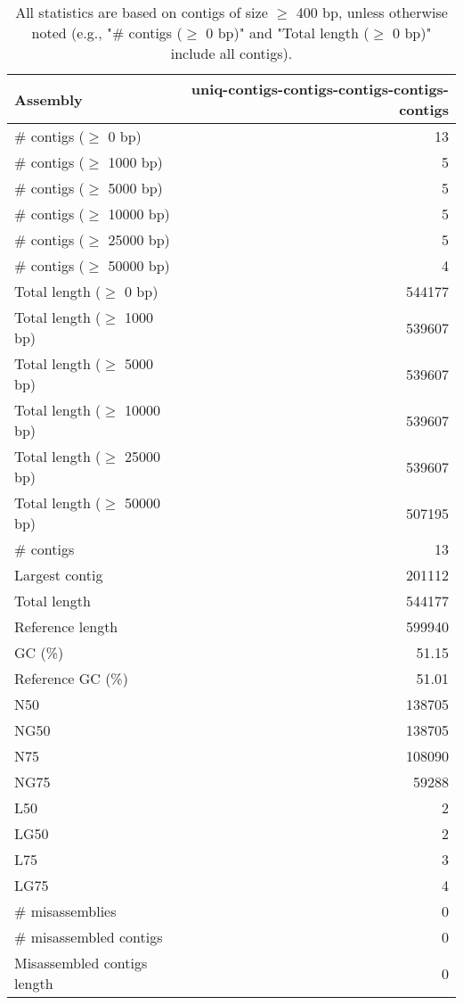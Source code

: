\documentclass[12pt,a4paper]{article}
\begin{document}
\begin{table}[ht]
\begin{center}
\caption{All statistics are based on contigs of size $\geq$ 400 bp, unless otherwise noted (e.g., "\# contigs ($\geq$ 0 bp)" and "Total length ($\geq$ 0 bp)" include all contigs).}
\begin{tabular}{|l*{1}{|r}|}
\hline
Assembly & uniq-contigs-contigs-contigs-contigs-contigs \\ \hline
\# contigs ($\geq$ 0 bp) & 13 \\ \hline
\# contigs ($\geq$ 1000 bp) & 5 \\ \hline
\# contigs ($\geq$ 5000 bp) & 5 \\ \hline
\# contigs ($\geq$ 10000 bp) & 5 \\ \hline
\# contigs ($\geq$ 25000 bp) & 5 \\ \hline
\# contigs ($\geq$ 50000 bp) & 4 \\ \hline
Total length ($\geq$ 0 bp) & 544177 \\ \hline
Total length ($\geq$ 1000 bp) & 539607 \\ \hline
Total length ($\geq$ 5000 bp) & 539607 \\ \hline
Total length ($\geq$ 10000 bp) & 539607 \\ \hline
Total length ($\geq$ 25000 bp) & 539607 \\ \hline
Total length ($\geq$ 50000 bp) & 507195 \\ \hline
\# contigs & 13 \\ \hline
Largest contig & 201112 \\ \hline
Total length & 544177 \\ \hline
Reference length & 599940 \\ \hline
GC (\%) & 51.15 \\ \hline
Reference GC (\%) & 51.01 \\ \hline
N50 & 138705 \\ \hline
NG50 & 138705 \\ \hline
N75 & 108090 \\ \hline
NG75 & 59288 \\ \hline
L50 & 2 \\ \hline
LG50 & 2 \\ \hline
L75 & 3 \\ \hline
LG75 & 4 \\ \hline
\# misassemblies & 0 \\ \hline
\# misassembled contigs & 0 \\ \hline
Misassembled contigs length & 0 \\ \hline

\end{tabular}
\end{center}
\end{table}
\end{document}
